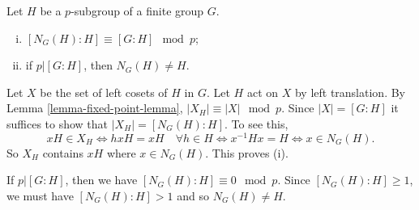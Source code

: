\begin{proposition} \label{prop-p-subgroup-and-normalizer}
	Let $H$ be a $p$-subgroup of a finite group $G$.
	\begin{enumerate}[(i)]
		\item $[N_G(H):H] \equiv [G:H] \mod p$;
		\item if $p|[G:H]$, then $N_G(H) \neq H$.
	\end{enumerate}
\end{proposition}
\begin{sketch}
	Let $X$ be the set of left cosets of $H$ in $G$. Let $H$ act on $X$ by left translation. By Lemma \ref{lemma-fixed-point-lemma}, $|X_H|\equiv |X|\mod p$. Since $|X| = [G:H]$ it suffices to show that $|X_H| = [N_G(H):H]$. To see this, 
	$$xH\in X_H\iff hxH = xH \quad \forall h\in H\iff x^{-1}Hx = H\iff x\in N_G(H).$$ 
	So $X_H$ contains $xH$ where $x\in N_G(H)$. This proves (i). 
	
	If $p|[G:H]$, then we have $[N_G(H):H]\equiv 0 \mod p$. Since $[N_G(H):H]\geq 1$, we must have $[N_G(H):H]>1$ and so $N_G(H)\neq H$.
\end{sketch}

